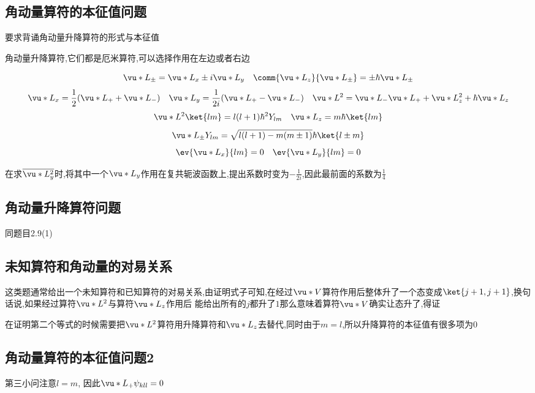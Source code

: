         \subsection{角动量算符的本征值问题}
            要求背诵角动量升降算符的形式与本征值
            \begin{formal}
                角动量升降算符,它们都是厄米算符,可以选择作用在左边或者右边

                $$ \vu*{L}_{\pm} = \vu*{L}_{x} \pm  i \vu*{L}_{y} \quad \comm{\vu*{L}_{z}}{\vu*{{L}}_{\pm}} = \pm \hbar \vu*{L}_{\pm} $$
                $$ \vu*{L}_{x}  = \frac{1}{2} (\vu*{L}_{+} + \vu*{L}_{-}) \quad \vu*{L}_{y} = \frac{1}{2i} (\vu*{L}_{+} - \vu*{L}_{-}) \quad \vu*{L}^{2} = \vu*{L}_{-} \vu*{L}_{+} + \vu*{L}_{z}^{2} + \hbar \vu*{L}_{z} $$
                $$ \vu*{L}^{2} \ket{lm} = l(l+1)\hbar^{2} Y_{lm} \quad \vu*{L}_{z} = m\hbar \ket{lm}$$
                $$ \vu*{L}_{\pm} Y_{lm} = \sqrt{l(l+1) - m(m \pm 1)}  \hbar \ket{l \pm m} $$
                $$ \ev{\vu*{L}_{x}}{lm} = 0 \quad \ev{\vu*{L}_{y}}{lm} = 0  $$
            \end{formal}

            在求$ \overline{\vu*{L}_{y}^{2}} $时,将其中一个$\vu*{L}_{y}$作用在复共轭波函数上,提出系数时变为$- \frac{1}{2i}$,因此最前面的系数为$\frac{1}{4}$
        
        \subsection{角动量升降算符问题}
            同题目2.9(1)
        
        \subsection{未知算符和角动量的对易关系}
            这类题通常给出一个未知算符和已知算符的对易关系,由证明式子可知,在经过$\vu*{V}$算符作用后整体升了一个态变成$\ket{j+1 ,j+1}$,换句话说,如果经过算符$\vu*{L}^{2}$与算符$\vu*{L}_{z}$作用后
            能给出所有的$j$都升了$1$那么意味着算符$\vu*{V}$确实让态升了,得证

            在证明第二个等式的时候需要把$\vu*{L}^{2}$算符用升降算符和$\vu*{L}_{z}$去替代,同时由于$m=l$,所以升降算符的本征值有很多项为0
        
        \subsection{角动量算符的本征值问题2}
            第三小问注意$ l = m $, 因此$\vu*{L}_{+} \psi_{kll} = 0 $
